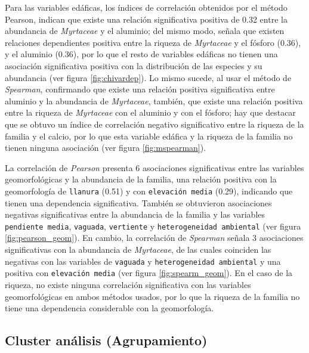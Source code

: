 \documentclass[11pt,]{article}
\begin{document}
Para las variables edáficas, los índices de correlación obtenidos por el
método Pearson, indican que existe una relación significativa positiva
de 0.32 entre la abundancia de \emph{Myrtaceae} y el aluminio; del mismo
modo, señala que existen relaciones dependientes positiva entre la
riqueza de \emph{Myrtaceae} y el fósforo (0.36), y el aluminio (0.36),
por lo que el resto de variables edáficas no tienen una asociación
significativa positiva con la distribución de las especies y su
abundancia (ver figura \ref{fig:chivardep}). Lo mismo sucede, al usar el
método de \emph{Spearman}, confirmando que existe una relación positiva
significativa entre aluminio y la abundancia de \emph{Myrtaceae},
también, que existe una relación positiva entre la riqueza de
\emph{Myrtaceae} con el aluminio y con el fósforo; hay que destacar que
se obtuvo un índice de correlación negativo significativo entre la
riqueza de la familia y el calcio, por lo que esta variable edáfica y la
riqueza de la familia no tienen ninguna asociación (ver figura
\ref{fig:mspearman}).

La correlación de \emph{Pearson} presenta 6 asociaciones significativas
entre las variables geomorfológicas y la abundancia de la familia, una
relación positiva con la geomorfología de \texttt{llanura} (0.51) y con
\texttt{elevación\ media} (0.29), indicando que tienen una dependencia
significativa. También se obtuvieron asociaciones negativas
significativas entre la abundancia de la familia y las variables
\texttt{pendiente\ media}, \texttt{vaguada}, \texttt{vertiente} y
\texttt{heterogeneidad\ ambiental} (ver figura \ref{fig:pearson_geom}).
En cambio, la correlación de \emph{Spearman} señala 3 asociaciones
significativas con la abundancia de \emph{Myrtaceae}, de las cuales
coinciden las negativas con las variables de \texttt{vaguada} y
\texttt{heterogeneidad\ ambiental} y una positiva con
\texttt{elevación\ media} (ver figura \ref{fig:spearm_geom}). En el caso
de la riqueza, no existe ninguna correlación significativa con las
variables geomorfológicas en ambos métodos usados, por lo que la riqueza
de la familia no tiene una dependencia considerable con la
geomorfología.

\subsection{Cluster análisis
(Agrupamiento)}\label{cluster-anuxe1lisis-agrupamiento}
\end{document}
